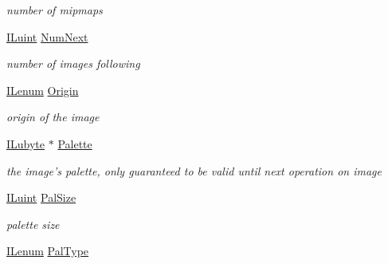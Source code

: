 \begin{DoxyCompactItemize}
\begin{DoxyCompactList}\small\item\em number of mipmaps \end{DoxyCompactList}\item 
\hypertarget{struct_i_l_uinfo_a4d2c3fed597dfde7feaea3217ef1ac35}{\hyperlink{group__il__types_gaff8e86a1072c8d7cfe387fb87c6ed8e1}{I\+Luint} \hyperlink{struct_i_l_uinfo_a4d2c3fed597dfde7feaea3217ef1ac35}{Num\+Next}}\label{struct_i_l_uinfo_a4d2c3fed597dfde7feaea3217ef1ac35}

\begin{DoxyCompactList}\small\item\em number of images following \end{DoxyCompactList}\item 
\hypertarget{struct_i_l_uinfo_a6f7c49ddc9cd419e2d2af24255df902a}{\hyperlink{group__il__types_ga62ca73445716183ef42b1f3906a45ed0}{I\+Lenum} \hyperlink{struct_i_l_uinfo_a6f7c49ddc9cd419e2d2af24255df902a}{Origin}}\label{struct_i_l_uinfo_a6f7c49ddc9cd419e2d2af24255df902a}

\begin{DoxyCompactList}\small\item\em origin of the image \end{DoxyCompactList}\item 
\hypertarget{struct_i_l_uinfo_ab520cff305ed9ee13d2eac7a87ac1d92}{\hyperlink{group__il__types_ga057357939bc5a12e8061715453568519}{I\+Lubyte} $\ast$ \hyperlink{struct_i_l_uinfo_ab520cff305ed9ee13d2eac7a87ac1d92}{Palette}}\label{struct_i_l_uinfo_ab520cff305ed9ee13d2eac7a87ac1d92}

\begin{DoxyCompactList}\small\item\em the image's palette, only guaranteed to be valid until next operation on image \end{DoxyCompactList}\item 
\hypertarget{struct_i_l_uinfo_a728a63d4c8b857a800a4d19e250a8c4b}{\hyperlink{group__il__types_gaff8e86a1072c8d7cfe387fb87c6ed8e1}{I\+Luint} \hyperlink{struct_i_l_uinfo_a728a63d4c8b857a800a4d19e250a8c4b}{Pal\+Size}}\label{struct_i_l_uinfo_a728a63d4c8b857a800a4d19e250a8c4b}

\begin{DoxyCompactList}\small\item\em palette size \end{DoxyCompactList}\item 
\hypertarget{struct_i_l_uinfo_ab091aab8d79003031a4e9957e85f43ca}{\hyperlink{group__il__types_ga62ca73445716183ef42b1f3906a45ed0}{I\+Lenum} \hyperlink{struct_i_l_uinfo_ab091aab8d79003031a4e9957e85f43ca}{Pal\+Type}}\label{struct_i_l_uinfo_ab091aab8d79003031a4e9957e85f43ca}


\end{DoxyCompactItemize}
